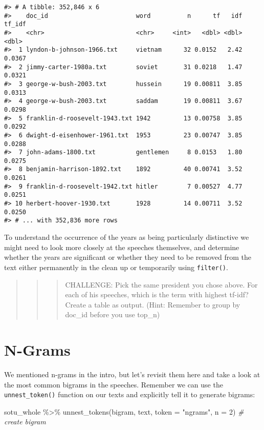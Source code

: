 \documentclass[
]{book}
\newenvironment{Shaded}{\begin{snugshade}}{\end{snugshade}}
\newcommand{\AttributeTok}[1]{\textcolor[rgb]{0.77,0.63,0.00}{#1}}
\newcommand{\CommentTok}[1]{\textcolor[rgb]{0.56,0.35,0.01}{\textit{#1}}}
\newcommand{\DecValTok}[1]{\textcolor[rgb]{0.00,0.00,0.81}{#1}}
\newcommand{\FunctionTok}[1]{\textcolor[rgb]{0.00,0.00,0.00}{#1}}
\newcommand{\NormalTok}[1]{#1}
\newcommand{\SpecialCharTok}[1]{\textcolor[rgb]{0.00,0.00,0.00}{#1}}
\newcommand{\StringTok}[1]{\textcolor[rgb]{0.31,0.60,0.02}{#1}}
\begin{document}
\begin{verbatim}
#> # A tibble: 352,846 x 6
#>    doc_id                        word          n      tf   idf tf_idf
#>    <chr>                         <chr>     <int>   <dbl> <dbl>  <dbl>
#>  1 lyndon-b-johnson-1966.txt     vietnam      32 0.0152   2.42 0.0367
#>  2 jimmy-carter-1980a.txt        soviet       31 0.0218   1.47 0.0321
#>  3 george-w-bush-2003.txt        hussein      19 0.00811  3.85 0.0313
#>  4 george-w-bush-2003.txt        saddam       19 0.00811  3.67 0.0298
#>  5 franklin-d-roosevelt-1943.txt 1942         13 0.00758  3.85 0.0292
#>  6 dwight-d-eisenhower-1961.txt  1953         23 0.00747  3.85 0.0288
#>  7 john-adams-1800.txt           gentlemen     8 0.0153   1.80 0.0275
#>  8 benjamin-harrison-1892.txt    1892         40 0.00741  3.52 0.0261
#>  9 franklin-d-roosevelt-1942.txt hitler        7 0.00527  4.77 0.0251
#> 10 herbert-hoover-1930.txt       1928         14 0.00711  3.52 0.0250
#> # ... with 352,836 more rows
\end{verbatim}

To understand the occurrence of the years as being particularly distinctive we might need to look more closely at the speeches themselves, and determine whether the years are significant or whether they need to be removed from the text either permanently in the clean up or temporarily using \texttt{filter()}.

\begin{quote}
\begin{quote}
\begin{quote}
CHALLENGE: Pick the same president you chose above. For each of his speeches, which is the term with highest tf-idf? Create a table as output. (Hint: Remember to group by doc\_id before you use top\_n)
\end{quote}
\end{quote}
\end{quote}

\hypertarget{n-grams}{%
\section{N-Grams}\label{n-grams}}

We mentioned n-grams in the intro, but let's revisit them here and take a look at the most common bigrams in the speeches. Remember we can use the \texttt{unnest\_token()} function on our texts and explicitly tell it to generate bigrams:

\begin{Shaded}
\begin{Highlighting}[]
\NormalTok{sotu\_whole }\SpecialCharTok{\%\textgreater{}\%}
  \FunctionTok{unnest\_tokens}\NormalTok{(bigram, text, }\AttributeTok{token =} \StringTok{"ngrams"}\NormalTok{, }\AttributeTok{n =} \DecValTok{2}\NormalTok{) }\CommentTok{\# create bigram}
\end{Highlighting}
\end{Shaded}
\end{document}

